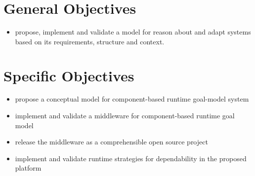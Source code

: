 \section{General Objectives}
\begin{itemize}
  \item propose, implement and validate a model for reason about and adapt systems based on its requirements, structure and context.
\end{itemize}

\section{Specific Objectives}
\begin{itemize}
  \item propose a conceptual model for component-based runtime goal-model system
  \item implement and validate a middleware for component-based runtime goal model
  \item release the middleware as a comprehensible open source project
  \item implement and validate runtime strategies for dependability in the proposed platform
\end{itemize}

